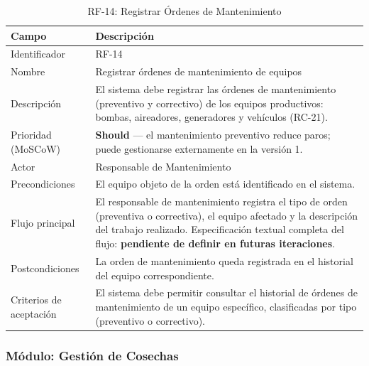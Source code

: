 \documentclass[12pt,a4paper]{article}
\begin{document}
\begin{table}[H]
\centering
\caption{RF-14: Registrar Órdenes de Mantenimiento}
\begin{tabular}{|p{3.6cm}|p{10.4cm}|}
\hline
\textbf{Campo} & \textbf{Descripción} \\
\hline
Identificador & RF-14 \\ \hline
Nombre & Registrar órdenes de mantenimiento de equipos \\ \hline
Descripción & El sistema debe registrar las órdenes de mantenimiento
(preventivo y correctivo) de los equipos productivos: bombas, aireadores,
generadores y vehículos (RC-21). \\ \hline
Prioridad (MoSCoW) & \textbf{Should} --- el mantenimiento preventivo reduce
paros; puede gestionarse externamente en la versión 1. \\ \hline
Actor & Responsable de Mantenimiento \\ \hline
Precondiciones & El equipo objeto de la orden está identificado en el sistema. \\ \hline
Flujo principal & El responsable de mantenimiento registra el tipo de orden
(preventiva o correctiva), el equipo afectado y la descripción del trabajo
realizado. Especificación textual completa del flujo: \textbf{pendiente de
definir en futuras iteraciones}. \\ \hline
Postcondiciones & La orden de mantenimiento queda registrada en el historial
del equipo correspondiente. \\ \hline
Criterios de aceptación & El sistema debe permitir consultar el historial de
órdenes de mantenimiento de un equipo específico, clasificadas por tipo
(preventivo o correctivo). \\ \hline
\end{tabular}
\end{table}

\subsubsection{Módulo: Gestión de Cosechas}
\end{document}
